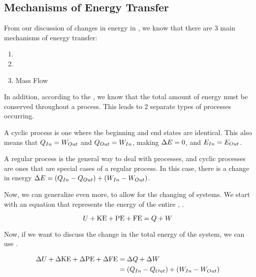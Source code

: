 \subsection{Mechanisms of Energy Transfer}\label{subsec:Mechanisms_Energy_Transfer}
From our discussion of changes in energy in , we know that there are 3 main mechanisms of energy transfer:
\begin{enumerate}[noitemsep]
\item {}
\item {}
\item Mass Flow
\end{enumerate}

In addition, according to the , we know that the total amount of energy must be conserved throughout a process.
This leads to 2 separate types of processes occurring.
\begin{description}[noitemsep]
\item[Cyclical] A cyclic process is one where the beginning and end states are identical.
  This also means that $Q_{In} = W_{Out}$ and $Q_{Out} = W_{In}$, making $\Delta E = 0$, and $E_{In} = E_{Out}$.
\item[Regular] A regular process is the general way to deal with processes, and cyclic processes are ones that are special cases of a regular process.
  In this case, there is a change in energy $\Delta E = (Q_{In} - Q_{Out}) + (W_{In} - W_{Out})$.
\end{description}

Now, we can generalize  even more, to allow for the changing of systems.
We start with an equation that represents the energy of the entire , .

\begin{equation}\label{eq:System_Energy}
  U + \mathrm{KE} + \mathrm{PE} + \mathrm{FE} = Q + W
\end{equation}

Now, if we want to discuss the change in the total energy of the system, we can use .

\begin{equation}\label{eq:Change_System_Energy}
  \begin{aligned}
    \Delta U + \Delta \mathrm{KE} + \Delta \mathrm{PE} + \Delta \mathrm{FE} &= \Delta Q + \Delta W \\
    &= (Q_{In} - Q_{Out}) + (W_{In} - W_{Out})
  \end{aligned}
\end{equation}

